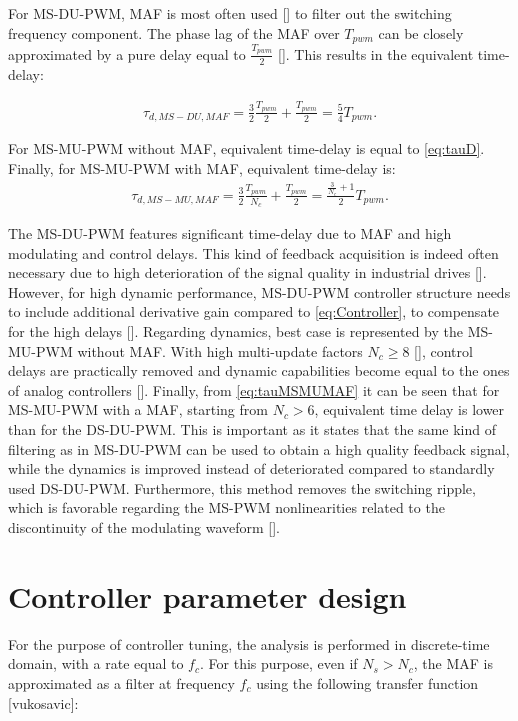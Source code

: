 \documentclass[journal]{IEEEtran}
\begin{document}
For MS-DU-PWM, MAF is most often used [] to filter out the switching frequency component. The phase lag of the MAF over $T_{pwm}$ can be closely approximated by a pure delay equal to $\frac{T_{pwm}}{2}$ []. This results in the equivalent time-delay:

\begin{equation}
\begin{aligned}
\tau_{d,MS-DU,MAF} = \frac{3}{2} \frac{T_{pwm}}{2} + \frac{T_{pwm}}{2} = \frac{5}{4} T_{pwm}.
\label{eq:tauMSDU} 
\end{aligned}    
\end{equation}

For MS-MU-PWM without MAF, equivalent time-delay is equal to \eqref{eq:tauD}.
Finally, for MS-MU-PWM with MAF, equivalent time-delay is:
\begin{equation}
\begin{aligned}
\tau_{d,MS-MU,MAF} = \frac{3}{2} \frac{T_{pwm}}{N_c} + \frac{T_{pwm}}{2} = \frac{\frac{3}{N_c}+1}{2}T_{pwm}.
\label{eq:tauMSMUMAF} 
\end{aligned}    
\end{equation}

The MS-DU-PWM features significant time-delay due to MAF and high modulating and control delays. This kind of feedback acquisition is indeed often necessary due to high deterioration of the signal quality in industrial drives []. However, for high dynamic performance, MS-DU-PWM controller structure needs to include additional derivative gain compared to \eqref{eq:Controller}, to compensate for the high delays []. Regarding dynamics, best case is represented by the MS-MU-PWM without MAF. With high multi-update factors $N_c \geq 8$ [], control delays are practically removed and dynamic capabilities become equal to the ones of analog controllers [].
Finally, from \eqref{eq:tauMSMUMAF} it can be seen that for MS-MU-PWM with a MAF, starting from $N_c>6$, equivalent time delay is lower than for the DS-DU-PWM. This is important as it states that the same kind of filtering as in MS-DU-PWM can be used to obtain a high quality feedback signal, while the dynamics is improved instead of deteriorated compared to standardly used DS-DU-PWM. Furthermore, this method removes the switching ripple, which is favorable regarding the MS-PWM nonlinearities related to the discontinuity of the modulating waveform []. 

\section{Controller parameter design}
For the purpose of controller tuning, the analysis is performed in discrete-time domain, with a rate equal to $f_c$. For this purpose, even if $N_s > N_c$, the MAF is approximated as a filter at frequency $f_c$ using the following transfer function [vukosavic]:
\end{document}
